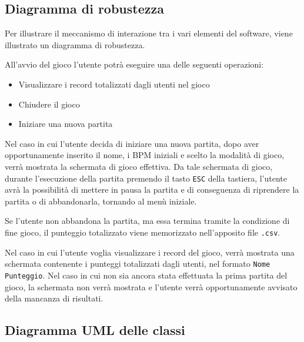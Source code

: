 \subsection{Diagramma di robustezza}
Per illustrare il meccanismo di interazione tra i vari elementi del software, viene illustrato un diagramma di robustezza.

\vspace{1cm}
\begin{figure}[h]
\end{figure}
\vspace{1.5cm}
All'avvio del gioco l'utente potrà eseguire una delle seguenti operazioni:
\begin{itemize}
    \item Visualizzare i record totalizzati dagli utenti nel gioco
    \item Chiudere il gioco
    \item Iniziare una nuova partita
\end{itemize}
\vspace{1cm}
Nel caso in cui l'utente decida di iniziare una nuova partita, dopo aver opportunamente inserito il nome, i BPM iniziali e scelto la modalità di gioco, verrà mostrata la schermata di gioco effettiva. Da tale schermata di gioco, durante l'esecuzione della partita premendo il tasto \texttt{ESC} della tastiera, l'utente avrà la possibilità di mettere in pausa la partita e di conseguenza di riprendere la partita o di abbandonarla, tornando al menù iniziale.

Se l'utente non abbandona la partita, ma essa termina tramite la condizione di fine gioco, il punteggio totalizzato viene memorizzato nell'apposito file \texttt{.csv}.
\vspace{0.5cm}

Nel caso in cui l'utente voglia visualizzare i record del gioco, verrà mostrata una schermata contenente i punteggi totalizzati dagli utenti, nel formato \texttt{Nome Punteggio}. Nel caso in cui non sia ancora stata effettuata la prima partita del gioco, la schermata non verrà mostrata e l'utente verrà opportunamente avvisato della mancanza di risultati.

\newpage
\subsection{Diagramma UML delle classi}
\vspace{2cm}
\begin{figure}[h]
\end{figure}

